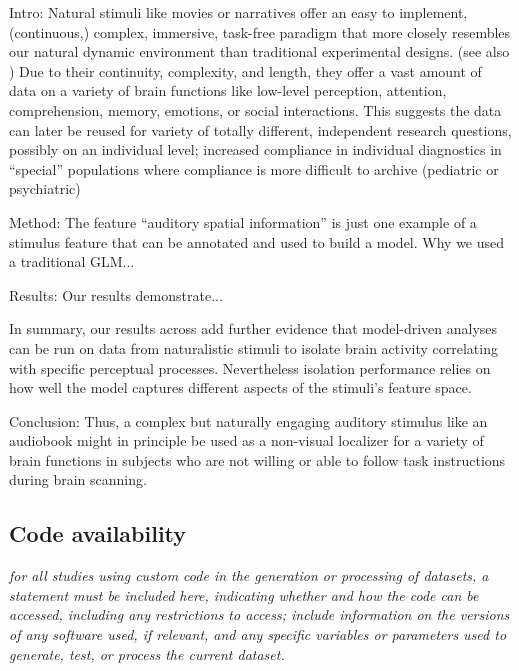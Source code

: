 \documentclass[english]{article}
\begin{document}
Intro: Natural stimuli like movies \citep{hasson2008neurocinematics,
sonkusare2019naturalistic} or narratives \citep{honey2012not,
lerner2011topographic, silbert2014coupled} offer an easy to implement,
(continuous,) complex, immersive, task-free paradigm that more closely resembles
our natural dynamic environment than traditional experimental designs.
(see also \citep{sonkusare2019naturalistic, eickhoff2020towards,hamilton2018revolution})
Due to their continuity, complexity, and length, they offer a vast amount of
data on a variety of brain functions like low-level perception, attention,
comprehension, memory, emotions, or social interactions. This suggests the data
can later be reused for variety of totally different, independent research
questions, possibly on an individual level; increased compliance in individual
diagnostics in ``special'' populations where compliance is more difficult to
archive (pediatric or psychiatric)

Method: The feature ``auditory spatial information'' is just one example of a
stimulus feature that can be annotated and used to build a model.
Why we used a traditional GLM...

Results: Our results demonstrate...

In summary, our results across add further evidence that model-driven analyses
can be run on data from naturalistic stimuli to isolate brain activity
correlating with specific perceptual processes.
Nevertheless isolation performance relies on how well the model captures
different aspects of the stimuli's feature space.

Conclusion: Thus, a complex but naturally engaging auditory stimulus like an
audiobook might in principle be used as a non-visual localizer for a variety of
brain functions in subjects who are not willing or able to follow task
instructions during brain scanning.


\subsection*{Code availability}
 \emph{for all studies using
    custom code in the generation or processing of datasets, a statement must be
    included here, indicating whether and how the code can be accessed,
including any restrictions to access; include information on the versions of any
software used, if relevant, and any specific variables or parameters used to
generate, test, or process the current dataset. }
\end{document}
